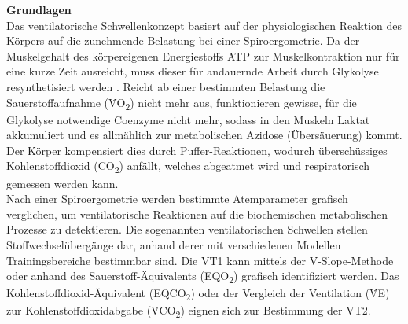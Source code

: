 \textbf{\Large Grundlagen}\\

Das ventilatorische Schwellenkonzept basiert auf der physiologischen Reaktion des Körpers auf die zunehmende Belastung bei einer Spiroergometrie. Da der Muskelgehalt des körpereigenen Energiestoffs ATP zur Muskelkontraktion nur für eine kurze Zeit ausreicht, muss dieser für andauernde Arbeit durch Glykolyse resynthetisiert werden \cite{Kroidl.2015}. Reicht ab einer bestimmten Belastung die Sauerstoffaufnahme (\.{V}O\textsubscript{2}) nicht mehr aus, funktionieren gewisse, für die Glykolyse notwendige Coenzyme nicht mehr, sodass in den Muskeln Laktat akkumuliert und es allmählich zur metabolischen Azidose (Übersäuerung) kommt. Der Körper kompensiert dies durch Puffer-Reaktionen, wodurch überschüssiges Kohlenstoffdioxid (CO\textsubscript{2}) anfällt, welches abgeatmet wird und respiratorisch gemessen werden kann.\\
Nach einer Spiroergometrie werden bestimmte Atemparameter grafisch verglichen, um ventilatorische Reaktionen auf die biochemischen metabolischen Prozesse zu detektieren. Die sogenannten ventilatorischen Schwellen stellen Stoffwechselübergänge dar, anhand derer mit verschiedenen Modellen Trainingsbereiche bestimmbar sind. Die VT1 kann mittels der V-Slope-Methode oder anhand des Sauerstoff-Äquivalents (EQO\textsubscript{2}) grafisch identifiziert werden. Das Kohlenstoffdioxid-Äquivalent (EQCO\textsubscript{2}) oder der Vergleich der Ventilation (\.{V}E) zur Kohlenstoffdioxidabgabe (\.{V}CO\textsubscript{2}) eignen sich zur Bestimmung der VT2.\\

